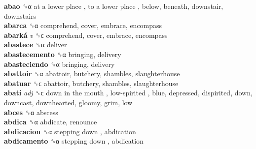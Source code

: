 \textbf{abao} ␝α   at a lower place ,  to a lower place , below, beneath, downstair, downstairs  \\
\textbf{abarca} ␝α  comprehend, cover, embrace, encompass  \\
\textbf{abarká} \emph{v}  ␝ϲ  comprehend, cover, embrace, encompass  \\
\textbf{abastece} ␝α  deliver  \\
\textbf{abastecemento} ␝α  bringing, delivery  \\
\textbf{abasteciendo} ␝α  bringing, delivery  \\
\textbf{abattoir} ␝α  abattoir, butchery, shambles, slaughterhouse  \\
\textbf{abatuar} ␝ϲ  abattoir, butchery, shambles, slaughterhouse  \\
\textbf{abatí} \emph{adj}  ␝ϲ   down in the mouth ,  low-spirited , blue, depressed, dispirited, down, downcast, downhearted, gloomy, grim, low  \\
\textbf{abces} ␝α  abscess  \\
\textbf{abdica} ␝α  abdicate, renounce  \\
\textbf{abdicacion} ␝α   stepping down , abdication  \\
\textbf{abdicamento} ␝α   stepping down , abdication  \\
